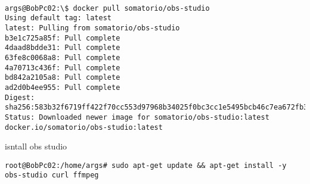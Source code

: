 \documentclass[../main.tex]{subfiles}
\begin{document}
\lstconsolestyle
\begin{lstlisting}

args@BobPc02:\$ docker pull somatorio/obs-studio
Using default tag: latest
latest: Pulling from somatorio/obs-studio
b3e1c725a85f: Pull complete 
4daad8bdde31: Pull complete 
63fe8c0068a8: Pull complete 
4a70713c436f: Pull complete 
bd842a2105a8: Pull complete 
ad2d0b4ee955: Pull complete 
Digest: sha256:583b32f6719ff422f70cc553d97968b34025f0bc3cc1e5495bcb46c7ea672fb3
Status: Downloaded newer image for somatorio/obs-studio:latest
docker.io/somatorio/obs-studio:latest
\end{lstlisting}
isntall obs studio
\lstconsolestyle
\begin{lstlisting}
root@BobPc02:/home/args# sudo apt-get update && apt-get install -y obs-studio curl ffmpeg
\end{lstlisting}
\end{document}
